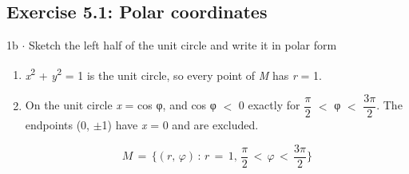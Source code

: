 \documentclass[11pt]{article}
\begin{document}
\begin{keepsection}\subsection{Exercise 5.1: Polar coordinates}

\begin{workedbox}{1b \ensuremath{\cdot} Sketch the left half of the unit circle and write it in polar form}
\begin{enumerate}
\item \textit{x}\textsuperscript{2} + \textit{y}\textsuperscript{2} = 1 is the unit circle, so every point of \textit{M} has \textit{r} = 1.
\item {}
On the unit circle \textit{x} = cos φ, and cos φ \ensuremath{<} 0 exactly for {\small\ensuremath{\dfrac{π}{2}}} \ensuremath{<} φ \ensuremath{<} {\small\ensuremath{\dfrac{3π}{2}}}. The endpoints (0, \ensuremath{\pm}1) have \textit{x} = 0 and are excluded.

\begin{equation*}{M}\, =\, \{({r},\, φ)\, :\, {r}\, =\, 1,\, \dfrac{π}{2}\, <\, φ\, <\, \dfrac{3π}{2}\}\end{equation*}


\end{enumerate}
\end{workedbox}
\end{keepsection}
\end{document}
